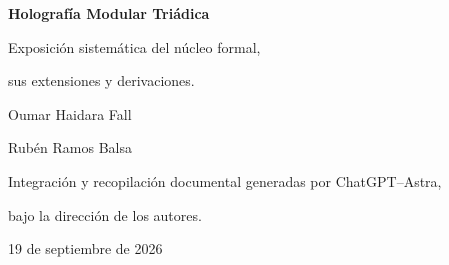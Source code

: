 \hypersetup{pageanchor=false}
\begin{titlepage}
\thispagestyle{empty}
\centering
\vspace*{2.9cm}
{\fontsize{27}{34}\selectfont\bfseries Holografía Modular Triádica\par}
\vspace{1.1cm}
{\fontsize{16}{22}\selectfont Exposición sistemática del núcleo formal,\par
sus extensiones y derivaciones.\par}
\vspace{2cm}
{\large Oumar Haidara Fall\par}
\vspace{.35cm}
{\large Rubén Ramos Balsa\par}
\vfill
{\small Integración y recopilación documental generadas por ChatGPT--Astra,\par
bajo la dirección de los autores.\par}
\vspace{1.1cm}
{\small 19 de septiembre de 2026\par}
\end{titlepage}
\hypersetup{pageanchor=true}
